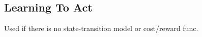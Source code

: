\newpage
\subsection{Learning To Act}
Used if there is no state-transition model or cost/reward func.
